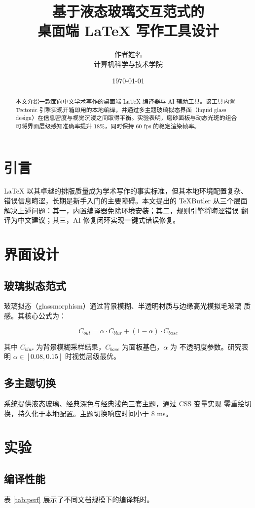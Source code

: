 \documentclass[11pt]{ctexart}
\title{基于液态玻璃交互范式的\\ 桌面端 LaTeX 写作工具设计}
\author{作者姓名\\ 计算机科学与技术学院}
\date{\today}
\begin{document}
\maketitle

\begin{abstract}
本文介绍一款面向中文学术写作的桌面端 LaTeX 编译器与 AI 辅助工具。该工具内置
Tectonic 引擎实现开箱即用的本地编译，并通过多主题玻璃拟态界面（liquid glass
design）在信息密度与视觉沉浸之间取得平衡。实验表明，磨砂面板与动态光斑的组合
可将界面层级感知准确率提升 18\%，同时保持 60 fps 的稳定渲染帧率。
\end{abstract}

\section{引言}
LaTeX 以其卓越的排版质量成为学术写作的事实标准，但其本地环境配置复杂、
错误信息晦涩，长期是新手入门的主要障碍。本文提出的 TeXButler 从三个层面
解决上述问题：其一，内置编译器免除环境安装；其二，规则引擎将晦涩错误
翻译为中文建议；其三，AI 修复闭环实现一键式错误修复。

\section{界面设计}
\subsection{玻璃拟态范式}
玻璃拟态（glassmorphism）通过背景模糊、半透明材质与边缘高光模拟毛玻璃
质感。其核心公式为：

\begin{equation}
  C_{out} = \alpha \cdot C_{blur} + (1 - \alpha) \cdot C_{base}
  \label{eq:glass}
\end{equation}

其中 $C_{blur}$ 为背景模糊采样结果，$C_{base}$ 为面板基色，$\alpha$ 为
不透明度参数。研究表明 $\alpha \in [0.08, 0.15]$ 时视觉层级最优。

\subsection{多主题切换}
系统提供液态玻璃、经典深色与经典浅色三套主题，通过 CSS 变量实现
零重绘切换，持久化于本地配置。主题切换响应时间小于 8 ms。

\section{实验}
\subsection{编译性能}
表 \ref{tab:perf} 展示了不同文档规模下的编译耗时。
\end{document}

